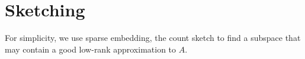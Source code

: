 \section{Sketching}

For simplicity, we use sparse embedding, \ie the count sketch
to find a subspace that may contain a good low-rank approximation to $A$.
